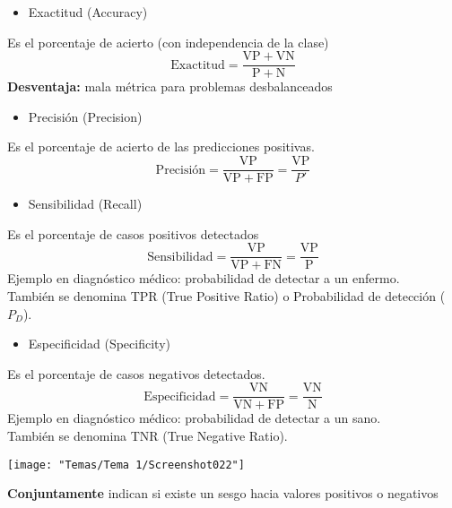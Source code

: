\begin{minipage}{0.55\textwidth}
	\begin{itemize}[label=\color{red}\textbullet, leftmargin=*]
	\item \color{lightblue}Exactitud (Accuracy)
\end{itemize}
Es el porcentaje de acierto (con independencia de la clase) \[ \mathrm{Exactitud}=\dfrac{\mathrm{VP}+\mathrm{VN}}{\mathrm{P}+\mathrm{N}} \]
\textbf{Desventaja:} mala métrica para problemas desbalanceados
\begin{itemize}[label=\color{red}\textbullet, leftmargin=*]
	\item \color{lightblue}Precisión (Precision)
\end{itemize}
Es el porcentaje de acierto de las predicciones positivas. \[ \text{Precisión}=\dfrac{\mathrm{VP}}{\mathrm{VP}+\mathrm{FP}}=\dfrac{\mathrm{VP}}{P'} \]
\begin{itemize}[label=\color{red}\textbullet, leftmargin=*]
	\item \color{lightblue}Sensibilidad (Recall)
\end{itemize}
Es el porcentaje de casos positivos detectados \[ \mathrm{Sensibilidad}=\dfrac{\mathrm{VP}}{\mathrm{VP}+\mathrm{FN}}=\dfrac{\mathrm{VP}}{\mathrm{P}} \]
Ejemplo en diagnóstico médico: probabilidad de detectar a un enfermo.\\
También se denomina TPR (True Positive Ratio) o Probabilidad de detección ($P_D$).
\begin{itemize}[label=\color{red}\textbullet, leftmargin=*]
	\item \color{lightblue}Especificidad (Specificity)
\end{itemize}
Es el porcentaje de casos negativos detectados. \[ \mathrm{Especificidad}=\dfrac{\mathrm{VN}}{\mathrm{VN}+\mathrm{FP}}=\dfrac{\mathrm{VN}}{\mathrm{N}} \]
Ejemplo en diagnóstico médico: probabilidad de detectar a un sano.\\
También se denomina TNR (True Negative Ratio).
\end{minipage}\qquad\begin{minipage}{0.4\textwidth}
	\begin{center}
		\texttt{[image: "Temas/Tema 1/Screenshot022"]}
	\end{center}
\end{minipage}

\textbf{Conjuntamente } indican si existe un sesgo hacia valores positivos o negativos

